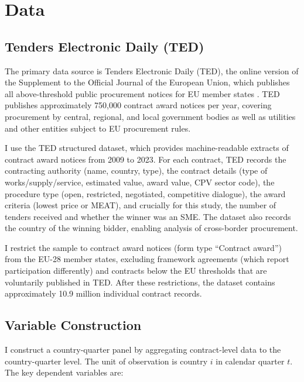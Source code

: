 \documentclass[12pt]{article}
\begin{document}



\section{Data}
\label{sec:data}

\subsection{Tenders Electronic Daily (TED)}

The primary data source is Tenders Electronic Daily (TED), the online version of the Supplement to the Official Journal of the European Union, which publishes all above-threshold public procurement notices for EU member states \citep{ted2023}. TED publishes approximately 750,000 contract award notices per year, covering procurement by central, regional, and local government bodies as well as utilities and other entities subject to EU procurement rules.

I use the TED structured dataset, which provides machine-readable extracts of contract award notices from 2009 to 2023. For each contract, TED records the contracting authority (name, country, type), the contract details (type of works/supply/service, estimated value, award value, CPV sector code), the procedure type (open, restricted, negotiated, competitive dialogue), the award criteria (lowest price or MEAT), and crucially for this study, the number of tenders received and whether the winner was an SME. The dataset also records the country of the winning bidder, enabling analysis of cross-border procurement.

I restrict the sample to contract award notices (form type ``Contract award'') from the EU-28 member states, excluding framework agreements (which report participation differently) and contracts below the EU thresholds that are voluntarily published in TED. After these restrictions, the dataset contains approximately 10.9 million individual contract records.

\subsection{Variable Construction}

I construct a country-quarter panel by aggregating contract-level data to the country-quarter level. The unit of observation is country $i$ in calendar quarter $t$. The key dependent variables are:
\end{document}

